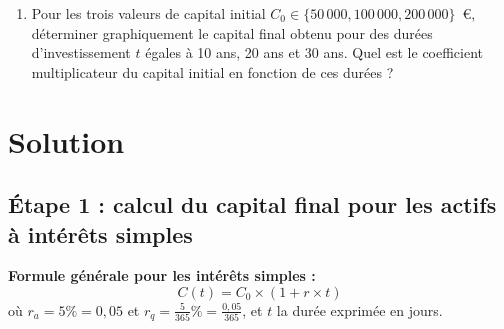 \documentclass{article}
\begin{document}
\begin{enumerate}[label=\textbf{Q1.\arabic*}]
\begin{enumerate}[label=\textbf{Q2.\arabic*}]
	      	\item Pour les trois valeurs de capital initial \( C_0 \in \{50\,000, 100\,000, 200\,000\} \)~€, déterminer graphiquement le capital final obtenu pour des durées d'investissement \( t \) égales à 10 ans, 20 ans et 30 ans. Quel est le coefficient multiplicateur du capital initial en fonction de ces durées ?
	      \end{enumerate}
	      
\end{enumerate}

\newpage
\section{Solution}
\subsection*{Étape 1 : calcul du capital final pour les actifs à intérêts simples}

\noindent
\textbf{Formule générale pour les intérêts simples :}
\[
	C(t) = C_0 \times \left(1 + r \times t\right)
\]
où $r_a = 5\% = 0,05$ et \( r_q = \frac{5}{365}\% = \frac{0,05}{365} \), et \( t \) la durée exprimée en jours.
\end{document}

